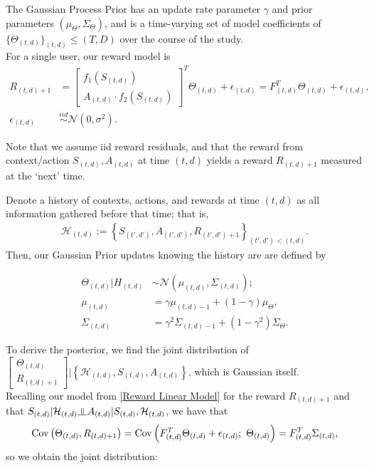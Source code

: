 The Gaussian Process Prior has an update rate parameter $\gamma$ and prior parameters $\displaystyle \left( \mu_{\Theta}, \Sigma_\Theta \right)$, and is a time-varying set of model coefficients of $\{\Theta_{(t,d)}\}_{(t,d)} \le (T, D)$ over the course of the study. \\

For a single user, our reward model is 
\begin{align}
	\displaystyle R_{(t,d)+1}  &= \begin{bmatrix} f_1(S_{(t,d)}) \\
A_{(t,d)} \cdot f_2(S_{(t,d)})
\end{bmatrix}^T \Theta_{(t,d)} + \epsilon_{(t,d)} = F_{(t,d)}^T \Theta_{(t,d)} + \epsilon_{(t,d)}, \label{Reward Linear Model} \\
\epsilon_{(t,d)} &\stackrel{iid}{\sim} \mathcal{N}\left(0, \sigma^2\right).
\end{align}

Note that we assume iid reward residuals, and that the reward from context/action $S_{(t,d)}, A_{(t,d)}$ at time $(t,d)$ yields a reward $R_{(t,d)+1}$ measured at the `next' time.

Denote a history of contexts, actions, and rewards at time $(t,d)$ as all information gathered before that time; that is,
\begin{align}
  	\mathcal{H}_{(t,d)} := \left\{S_{(t',d')}, A_{(t',d')}, R_{(t',d') + 1} \right\}_{(t',d') < (t,d)}.
  \end{align}  Then, our Gaussian Prior updates knowing the history are are defined by 

\begin{align}
	\Theta_{(t,d)} | H_{(t,d)} &\sim \mathcal{N}\left(\mu_{(t,d)}, \Sigma_{(t,d)}\right); \\
	\mu_{(t,d)} &= \gamma \mu_{(t,d)-1} + (1-\gamma) \mu_{\Theta}, \label{GP Mu Update}\\
	\Sigma_{(t,d)} &= \gamma^2 \Sigma_{(t,d)-1} + (1-\gamma^2) \Sigma_\Theta.
\end{align}

To derive the posterior, we find the joint distribution of $\begin{bmatrix}\Theta_{(t,d)} \\
R_{(t,d)+1}
\end{bmatrix} | \left\{\mathcal{H}_{(t,d)}, S_{(t,d)}, A_{(t,d)} \right\}$, which is Gaussian itself. \\

 Recalling our model from \ref{Reward Linear Model} for the reward $R_{(t,d)+1}$ and that $S_{(t,d)} | \mathcal{H}_{(t,d)} \indep A_{(t,d)} | S_{(t,d)}, \mathcal{H}_{(t,d)}$, we have that
$$\mathrm{Cov}\left(\Theta_{(t,d)}, R_{(t,d)+1}\right) = \mathrm{Cov}\left(F_{(t,d)}^T \Theta_{(t,d)} + \epsilon_{(t,d)};\  \Theta_{(t,d)} \right) = F_{(t,d)}^T \Sigma_{(t,d)},$$ so we obtain the joint distribution:

